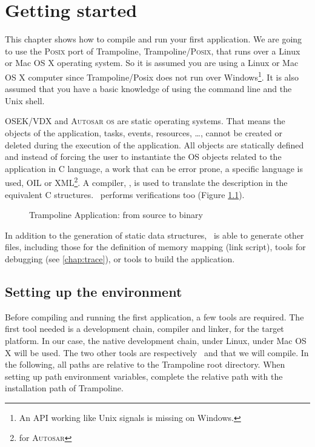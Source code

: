 
\chapter{Getting started}

This chapter shows how to compile and run your first application. We are going to use the \textsc{Posix} port of Trampoline, Trampoline/\textsc{Posix}, that runs over a Linux or Mac OS X operating system. So it is assumed you are using a Linux or Mac OS X computer since Trampoline/Posix does not run over Windows\footnote{An API working like Unix signals is missing on Windows.}. It is also assumed that you have a basic knowledge of using the command line and the Unix shell.

OSEK/VDX and \textsc{Autosar os} are static operating systems. That means the objects of the application, tasks, events, resources, \ldots, cannot be created or deleted during the execution of the application. All objects are statically defined and instead of forcing the user to instantiate the OS objects related to the application in C language, a work that can be error prone, a specific language is used, OIL or XML\footnote{for \textsc{Autosar}}. A compiler, \goil, is used to translate the description in the equivalent C structures. \goil\ performs verifications too (Figure \ref{fig:files}).

\begin{figure}[htbp]
  \centering
\begin{adjustbox}{width=.7\linewidth,keepaspectratio}
  
\end{adjustbox}
\caption{Trampoline Application: from source to binary}
\label{fig:files}
\end{figure}

In addition to the generation of static data structures, \goil\ is able to generate other files, including those for the definition of memory mapping (link script), tools for debugging (see \ref{chap:trace}), or tools to build the application.

\section{Setting up the environment}

Before compiling and running the first application, a few tools are required. The first tool needed is a development chain, compiler and linker, for the target platform. In our case, the native development chain,  under Linux,  under Mac OS X will be used. The two other tools are respectively \goil\ and  that we will compile. In the following, all paths are relative to the Trampoline root directory. When setting up path environment variables, complete the relative path with the installation path of Trampoline.

